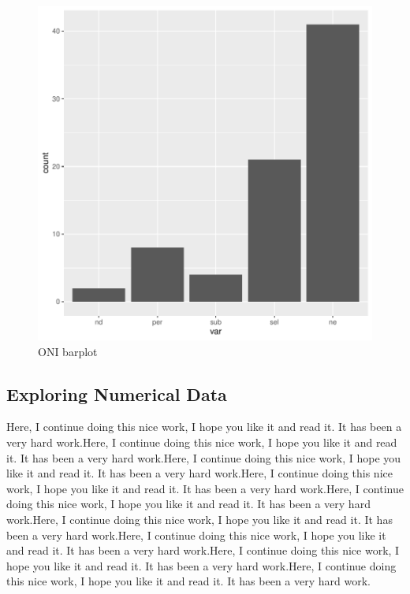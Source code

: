 \documentclass[11pt]{article}
\begin{document}
\begin{figure}[h]
\centering
\begin{adjustbox}{width=7cm,height=5cm}
\includegraphics{PaperInR_7-cat_plot}
\end{adjustbox}
\caption{ONI barplot}  %
\label{catexplore_plot} %
\end{figure}





\subsection{Exploring Numerical Data}\label{numexplo}

Here, I continue doing this nice work, I hope you like it and read it. It has been a very hard work.Here, I continue doing this nice work, I hope you like it and read it. It has been a very hard work.Here, I continue doing this nice work, I hope you like it and read it. It has been a very hard work.Here, I continue doing this nice work, I hope you like it and read it. It has been a very hard work.Here, I continue doing this nice work, I hope you like it and read it. It has been a very hard work.Here, I continue doing this nice work, I hope you like it and read it. It has been a very hard work.Here, I continue doing this nice work, I hope you like it and read it. It has been a very hard work.Here, I continue doing this nice work, I hope you like it and read it. It has been a very hard work.Here, I continue doing this nice work, I hope you like it and read it. It has been a very hard work.
\end{document}
